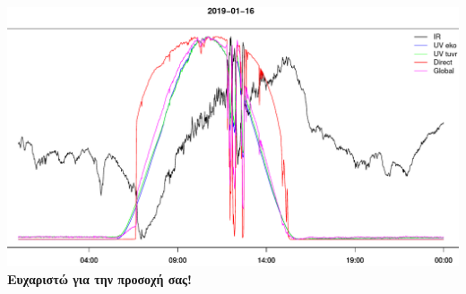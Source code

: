 \documentclass[hyperref={pdfpagelabels=false}]{beamer}
\begin{document}
\begin{frame}%

\begin{center}
    \includegraphics[width=.99\textwidth]{files/multiplot.png}
    \vfill
    {\color{blue} {\Large \textbf{Ευχαριστώ για την προσοχή σας!}}}
\end{center}


\end{frame}
\end{document}
